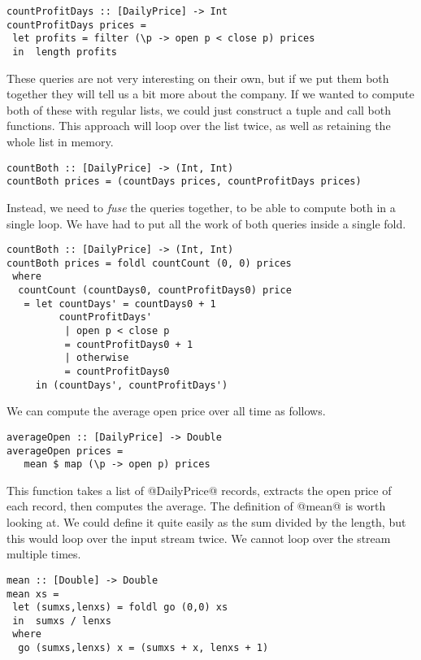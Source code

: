 \begin{lstlisting}
countProfitDays :: [DailyPrice] -> Int
countProfitDays prices =
 let profits = filter (\p -> open p < close p) prices
 in  length profits
\end{lstlisting}

These queries are not very interesting on their own, but if we put them both together they will tell us a bit more about the company.
If we wanted to compute both of these with regular lists, we could just construct a tuple and call both functions.
This approach will loop over the list twice, as well as retaining the whole list in memory.

\begin{lstlisting}
countBoth :: [DailyPrice] -> (Int, Int)
countBoth prices = (countDays prices, countProfitDays prices)
\end{lstlisting}

Instead, we need to \emph{fuse} the queries together, to be able to compute both in a single loop.
We have had to put all the work of both queries inside a single fold.

\begin{lstlisting}
countBoth :: [DailyPrice] -> (Int, Int)
countBoth prices = foldl countCount (0, 0) prices
 where
  countCount (countDays0, countProfitDays0) price
   = let countDays' = countDays0 + 1
         countProfitDays'
          | open p < close p
          = countProfitDays0 + 1
          | otherwise
          = countProfitDays0
     in (countDays', countProfitDays')
\end{lstlisting}


We can compute the average open price over all time as follows.

\begin{lstlisting}
averageOpen :: [DailyPrice] -> Double
averageOpen prices =
   mean $ map (\p -> open p) prices
\end{lstlisting}

This function takes a list of @DailyPrice@ records, extracts the open price of each record, then computes the average.
The definition of @mean@ is worth looking at.
We could define it quite easily as the sum divided by the length, but this would loop over the input stream twice. We cannot loop over the stream multiple times.

\begin{lstlisting}
mean :: [Double] -> Double
mean xs =
 let (sumxs,lenxs) = foldl go (0,0) xs
 in  sumxs / lenxs
 where
  go (sumxs,lenxs) x = (sumxs + x, lenxs + 1)
\end{lstlisting}

